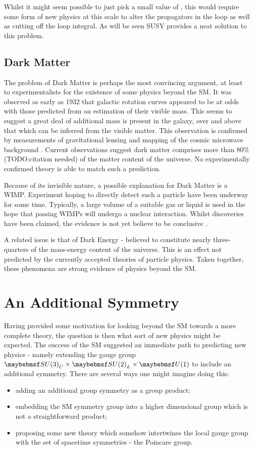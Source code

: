 Whilst it might seem possible to just pick a small value of \LambdaUV, this
would require some form of new physics at this scale to alter the propagators in
the loop as well as cutting off the loop integral. As will be seen \ac{SUSY}
provides a neat solution to this problem.

\subsection{Dark Matter}
The problem of Dark Matter is perhaps the most convincing argument, at least to
experimentalists for the existence of some physics beyond the \ac{SM}. It was
observed as early as 1932 \cite{darkmatter_review} that galactic rotation curves
appeared to be at odds with those predicted from an estimation of their visible
mass. This seems to suggest a great deal of additional mass is present in the
galaxy, over and above that which can be inferred from the visible matter. This
observation is confirmed by measurements of gravitational lensing
\cite{bullet_cluster} and mapping of the cosmic microwave background
\cite{wmap_7year}. Current observations suggest dark matter comprises more than
80\% (TODO:citation needed) of the matter content of the universe. No
experimentally confirmed theory is able to match such a prediction.

Because of its invisible nature, a possible explanation for Dark Matter is a
\acl{WIMP}. Experiment hoping to directly detect such a particle have been
underway for some time. Typically, a large volume of a suitable gas or liquid is
used in the hope that passing \acp{WIMP} will undergo a nuclear
interaction. Whilst discoveries have been claimed, the evidence is not yet
believe to be conclusive \cite{dama_libra}.

A related issue is that of Dark Energy - believed to constitute nearly
three-quarters of the mass-energy content of the universe. This is an effect not
predicted by the currently accepted theories of particle physics. Taken
together, these phenomena are strong evidence of physics beyond the \ac{SM}.

\section{An Additional Symmetry}
Having provided some motivation for looking beyond the \ac{SM} towards a more
complete theory, the question is then what sort of new physics might be
expected. The success of the \ac{SM} suggested an immediate path to predicting
new physics - namely extending the gauge group
$\SUthree_C\times\SUtwo_L\times\Uone$ to include an additional symmetry. There
are several ways one might imagine doing this:
\begin{itemize}
\item adding an additional group symmetry as a group product;
\item embedding the \ac{SM} symmetry group into a higher dimensional group which
  is not a straightforward product;
\item proposing some new theory which somehow intertwines the local gauge group
  with the set of spacetime symmetries - the Poincare group.
\end{itemize}
